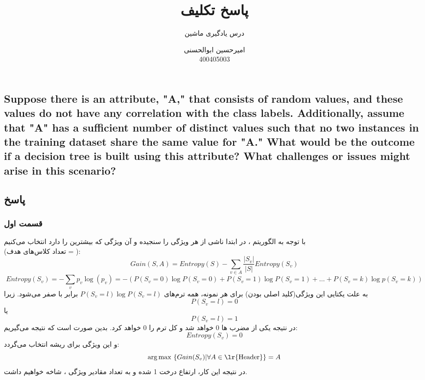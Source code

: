 \documentclass{article}
\title{پاسخ تکلیف 
	\lr{Decision Tree}
}
\author{درس یادگیری ماشین}
\date{
	امیرحسین ابوالحسنی\\
	400405003
	}
\DeclareMathOperator*{\argmax}{arg\,max}
\begin{document}
	\maketitle
	
	\begin{latin}
		\section{Suppose there is an attribute, "A," that consists of random values, and these
			values do not have any correlation with the class labels. Additionally, assume that
			"A" has a sufficient number of distinct values such that no two instances in the
			training dataset share the same value for "A." What would be the outcome if a
			decision tree is built using this attribute? What challenges or issues might arise in
			this scenario?}
	\end{latin}
	\noindent
	\subsection*{پاسخ}
	\subsubsection*{قسمت اول}
	با توجه به الگوریتم 
	،
	در ابتدا 
	ناشی از هر ویژگی را سنجیده و آن ویژگی که بیشترین 
	را دارد انتخاب می‌کنیم\\
	(تعداد کلاس‌های هدف = ):
	\[
	Gain(S, A) = Entropy(S) - \sum_{v \in A} \frac{| S_v |}{| S |}Entropy(S_v)
	\] 
	\[
	Entropy(S_v) = -\sum_{v} p_v\log (p_v) = -(P(S_v = 0) \log P(S_v = 0) + P(S_v = 1) \log P(S_v = 1) + \dots‌+ P(S_v = k) \log p(S_v = k))
	\]
	به علت یکتایی این ویژگی(کلید اصلی بودن) برای هر نمونه، همه ترم‌های $P(S_v = l) \log P(S_v = l)$ برابر با صفر می‌شود.  زیرا 
	\[
	P(S_v = l) = 0
	\]
	یا
	\[
	P(S_v = l) = 1
	\]
	 در نتیجه یکی از مضرب ها 0 خواهد شد و کل ترم‌ را 0 خواهد کرد. بدین صورت است که نتیجه می‌گیریم:
	\[
	Entropy(S_v) = 0
	\]
	و این ویژگی برای ریشه انتخاب می‌گردد:
	\[
	\argmax ~ \{Gain(S_v) |\forall A \in \text{\lr{Header}}\} = A
	\]
	در نتیجه این کار، ارتفاع درخت 1 شده و به تعداد مقادیر ویژگی 
	،
شاخه خواهیم داشت.
\end{document}
